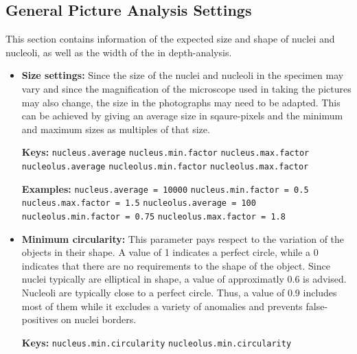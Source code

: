 \documentclass[a4paper, 11pt]{article}
\newcommand{\code}[1]{\colorbox{codegray}{\texttt{#1}}}
\begin{document}
\subsection{General Picture Analysis Settings}
This section contains information of the expected size and shape of nuclei and
nucleoli, as well as the width of the in depth-analysis.

\begin{itemize}
  \item \textbf{Size settings:} Since the size of the nuclei and nucleoli in the
  specimen may vary and since the magnification of the microscope used in taking the
  pictures may also change, the size in the photographs may need to be adapted.
  This can be achieved by giving an average size in sqaure-pixels and the
  minimum and maximum sizes as multiples of that size.
  
  \textbf{Keys:}
  \newline \code{nucleus.average}
  \newline \code{nucleus.min.factor}
  \newline \code{nucleus.max.factor}
  \newline \code{nucleolus.average}
  \newline \code{nucleolus.min.factor}
  \newline \code{nucleolus.max.factor}
  
  \textbf{Examples:}
  \newline \code{nucleus.average = 10000}
  \newline \code{nucleus.min.factor = 0.5}
  \newline \code{nucleus.max.factor = 1.5}
  \newline \code{nucleolus.average = 100}
  \newline \code{nucleolus.min.factor = 0.75}
  \newline \code{nucleolus.max.factor = 1.8}
  
  \item \textbf{Minimum circularity:} This parameter pays respect to the
  variation of the objects in their shape. A value of 1 indicates a perfect
  circle, while a 0 indicates that there are no requirements to the shape of the
  object. Since nuclei typically are elliptical in shape, a value of
  approximatly 0.6 is advised. Nucleoli are typically close to a perfect circle.
  Thus, a value of 0.9 includes most of them while it excludes a variety of
  anomalies and prevents false-positives on nuclei borders.
  
  \textbf{Keys:}
  \newline \code{nucleus.min.circularity}
  \newline \code{nucleolus.min.circularity}
  

\end{itemize}
\end{document}
